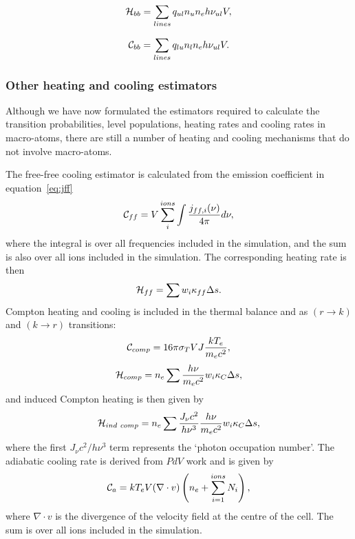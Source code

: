 \begin{equation}
{\cal H}_{bb} = \sum_{lines} q_{ul} n_u n_e h \nu_{ul} V,
\end{equation}


\begin{equation}
{\cal C}_{bb} = \sum_{lines} q_{lu} n_l n_e h \nu_{ul} V.
\end{equation}

\subsubsection{Other heating and cooling estimators}
Although we have now formulated the estimators required to calculate the 
transition probabilities, level populations, heating rates and cooling rates in macro-atoms, 
there are still a number of heating and cooling mechanisms that do not involve macro-atoms. 

The free-free cooling estimator is calculated from the emission coefficient
in equation~\ref{eq:jff} 
\begin{equation}
{\cal C}_{ff} = V \sum_i^{ions} \int \frac{j_{ff,i}(\nu)}{4\pi} d\nu,
\end{equation}
where the integral is over all frequencies included in the simulation,
and the sum is also over all ions included in the simulation.
The corresponding heating rate is then
\begin{equation}
{\cal H}_{ff} = \sum w_i \kappa_{ff} \Delta s.
\end{equation}
Compton heating and cooling is included in the thermal balance and as
$(r\rightarrow k)$ and $(k\rightarrow r)$ transitions:
\begin{equation}
{\cal C}_{comp} = 16 \pi \sigma_T V J \frac{k T_e}{m_e c^2},
\end{equation}
\begin{equation}
{\cal H}_{comp} = n_e \sum \frac{h\nu}{m_e c^2} w_i \kappa_{C}\Delta s,
\end{equation}
and induced Compton heating is then given by \citep{cloudy2013}
\begin{equation}
{\cal H}_{ind~comp} = n_e \sum \frac{J_\nu c^2}{h \nu^3} \frac{h\nu}{m_e c^2} 
w_i \kappa_{C} \Delta s,
\end{equation}
where the first $J_\nu c^2/h \nu^3$ term represents the `photon occupation number'.
The adiabatic cooling rate is derived from $PdV$ work and is given by
\begin{equation}
{\cal C}_{a} = k T_e V (\nabla \cdot v) \left(n_e + \sum\limits_{i=1}^{ions} N_i\right),
\end{equation}
where $\nabla \cdot v$ is the divergence of the 
velocity field at the centre of the cell. The sum is over all ions 
included in the simulation.

